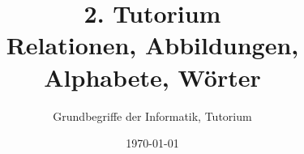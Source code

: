 




\title[Relationen, Abbildungen, Alphabete, Wörter]{2. Tutorium\\ Relationen, Abbildungen, Alphabete, Wörter}
\subtitle{Grundbegriffe der Informatik, Tutorium \hashtag\mytutnumber}
\date{\today}


\titleframe
\roadmap



	
